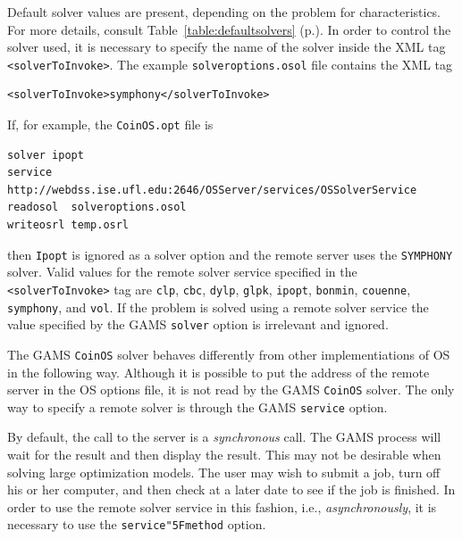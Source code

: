 \documentclass[11pt]{article}
\renewcommand{\_}{{\char"5F}}
\renewcommand{\{}{{\char"7B}}
\renewcommand{\}}{{\char"7D}}
\renewcommand{\^}{{\char"0D}}
\renewcommand{\'}{{\char"0D}}
\begin{document}
\begin{enumerate}[Step 1:]
Default solver values are present, depending on the problem for characteristics. For more details, consult 
Table~\ref{table:defaultsolvers} (p.\pageref{table:defaultsolvers}).
In order to control the solver used, it is necessary to specify the name of the solver
inside the XML tag {\tt <solverToInvoke>}. The example  {\tt solveroptions.osol} file contains the XML tag
\begin{verbatim}
<solverToInvoke>symphony</solverToInvoke>
\end{verbatim}
If, for example,  the {\tt CoinOS.opt} file is
\begin{verbatim}
solver ipopt
service http://webdss.ise.ufl.edu:2646/OSServer/services/OSSolverService
readosol  solveroptions.osol
writeosrl temp.osrl
\end{verbatim}
then {\tt Ipopt} is ignored as a solver option and the remote server uses the {\tt  SYMPHONY} solver.  
Valid values for the remote solver service specified in the {\tt <solverToInvoke>} tag are {\tt clp},  
{\tt cbc},  {\tt dylp}, {\tt glpk}, {\tt ipopt}, {\tt bonmin},   {\tt couenne},  {\tt symphony}, and 
{\tt vol}.  If the problem is solved using a remote solver service the value specified by the GAMS {\tt solver} option is irrelevant and ignored. 

The GAMS {\tt CoinOS} solver behaves differently from other implementiations of OS
in the following way.  
Although it is  possible to put the address of the remote server in the OS options file, it is not read 
by the GAMS {\tt CoinOS} solver. The only way to specify a remote solver is through the GAMS  
{\tt service} option.



By default, the call to the server is a {\it synchronous} call. The GAMS process will wait for the result 
and then display the result. This may not be desirable when solving large optimization models.  
The user may wish to submit a job, turn off his or her computer,  and then check at a later date to see 
if the job is finished.  In order to use the remote solver service in this fashion, i.e., 
{\it asynchronously}, it  is necessary to use the  {\tt service\_method} option.


\end{enumerate}
\end{document}
